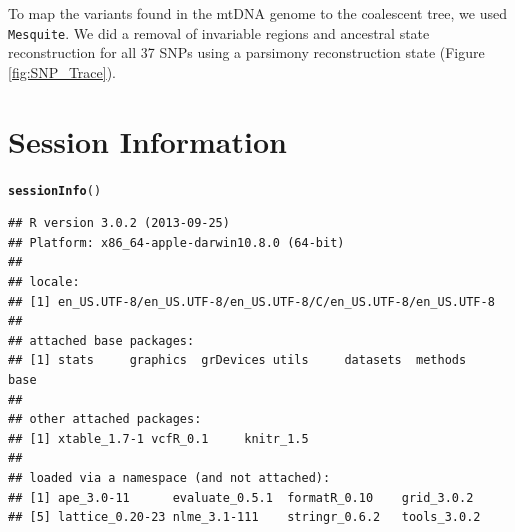 \documentclass{article}\usepackage[]{graphicx}\usepackage[]{color}
\makeatletter
\newcommand{\hlstd}[1]{\textcolor[rgb]{0.345,0.345,0.345}{#1}}%
\newcommand{\hlkwd}[1]{\textcolor[rgb]{0.737,0.353,0.396}{\textbf{#1}}}%
\newenvironment{kframe}{%
 \def\at@end@of@kframe{}%
 \ifinner\ifhmode%
  \def\at@end@of@kframe{\end{minipage}}%
  \begin{minipage}{\columnwidth}%
 \fi\fi%
 \def\FrameCommand##1{\hskip\@totalleftmargin \hskip-\fboxsep
 \colorbox{shadecolor}{##1}\hskip-\fboxsep
     \hskip-\linewidth \hskip-\@totalleftmargin \hskip\columnwidth}%
 \MakeFramed {\advance\hsize-\width
   \@totalleftmargin\z@ \linewidth\hsize
   \@setminipage}}%
 {\par\unskip\endMakeFramed%
 \at@end@of@kframe}
\newenvironment{knitrout}{}{} %
\makeatother
\begin{document}
To map the variants found in the mtDNA genome to the coalescent tree, we used \texttt{Mesquite}. We did a removal of invariable regions and ancestral state reconstruction for all 37 SNPs using a parsimony reconstruction state (Figure \ref{fig:SNP_Trace}).

\newpage






\vspace{24pt}


\section{Session Information}

\begin{knitrout}
\color{fgcolor}\begin{kframe}
\begin{alltt}
\hlkwd{sessionInfo}\hlstd{()}
\end{alltt}
\begin{verbatim}
## R version 3.0.2 (2013-09-25)
## Platform: x86_64-apple-darwin10.8.0 (64-bit)
## 
## locale:
## [1] en_US.UTF-8/en_US.UTF-8/en_US.UTF-8/C/en_US.UTF-8/en_US.UTF-8
## 
## attached base packages:
## [1] stats     graphics  grDevices utils     datasets  methods   base     
## 
## other attached packages:
## [1] xtable_1.7-1 vcfR_0.1     knitr_1.5   
## 
## loaded via a namespace (and not attached):
## [1] ape_3.0-11      evaluate_0.5.1  formatR_0.10    grid_3.0.2     
## [5] lattice_0.20-23 nlme_3.1-111    stringr_0.6.2   tools_3.0.2
\end{verbatim}
\end{kframe}
\end{knitrout}






\end{document}
